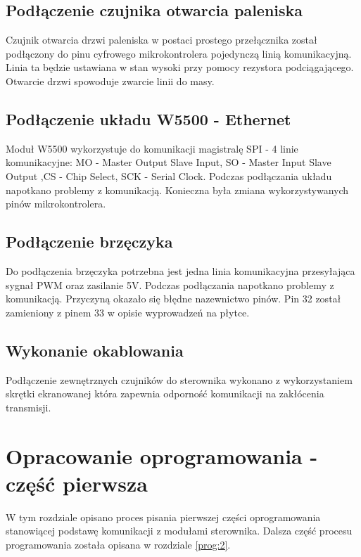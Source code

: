 \documentclass[11pt]{report}
\begin{document}
 \section{Podłączenie czujnika otwarcia paleniska}
 Czujnik otwarcia drzwi paleniska w postaci prostego przełącznika został podłączony do pinu cyfrowego mikrokontrolera pojedynczą linią komunikacyjną. Linia ta będzie ustawiana w stan wysoki przy pomocy rezystora podciągającego. Otwarcie drzwi spowoduje zwarcie linii do masy. 
 
  \section{Podłączenie układu W5500 - Ethernet}
 Moduł W5500 wykorzystuje do komunikacji magistralę SPI - 4 linie komunikacyjne: MO - Master Output Slave Input, SO - Master Input Slave Output ,CS - Chip Select, SCK - Serial Clock.
 Podczas podłączania układu napotkano problemy z komunikacją. Konieczna była zmiana wykorzystywanych pinów mikrokontrolera.
 
 \section{Podłączenie brzęczyka}
 Do podłączenia brzęczyka potrzebna jest jedna linia komunikacyjna przesyłająca sygnał PWM oraz zasilanie 5V. Podczas podłączania napotkano problemy z komunikacją. Przyczyną okazało się błędne nazewnictwo pinów. Pin 32 został zamieniony z pinem 33 w opisie wyprowadzeń na płytce.
 
 
 \section{Wykonanie okablowania}
 Podłączenie zewnętrznych czujników do sterownika wykonano z wykorzystaniem skrętki ekranowanej która zapewnia odporność komunikacji na zakłócenia transmisji.
 
 
 \chapter{Opracowanie oprogramowania - część pierwsza}\label{ch:oprog:1}
 W tym rozdziale opisano proces pisania pierwszej części oprogramowania stanowiącej podstawę komunikacji z modułami sterownika. Dalsza część procesu programowania została opisana w rozdziale \ref{prog:2}.
 
\end{document}
